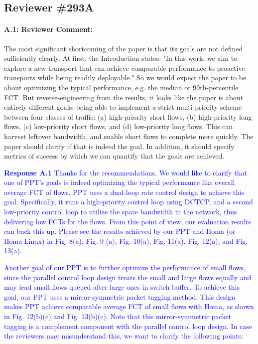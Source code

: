 \documentclass[12pt,one-column]{article}
\begin{document}
\subsection{Reviewer \#293A}
{\it \paragraph{A.1: Reviewer Comment:} The most significant shortcoming of the paper is that its goals are not defined sufficiently clearly. At first, the Introduction states: "In this work, we aim to explore a new transport that can achieve comparable performance to proactive transports while being readily deployable." So we would expect the paper to be about optimizing the typical performance, e.g. the median or 99th-percentile FCT. But reverse-engineering from the results, it looks like the paper is about entirely different goals: being able to implement a strict multi-priority scheme between four classes of traffic: (a) high-priority short flows, (b) high-priority long flows, (c) low-priority short flows, and (d) low-priority long flows. This can harvest leftover bandwidth, and enable short flows to complete more quickly. The paper should clarify if that is indeed the goal. In addition, it should specify metrics of success by which we can quantify that the goals are achieved.}

\noindent\textcolor{blue}{\textbf{Response A.1}
Thanks for the recommendations.
We would like to clarify that one of PPT's goals is indeed optimizing the typical performance like overall average FCT of flows. PPT uses a dual-loop rate control design to achieve this goal. Specifically, it runs a high-priority control loop using DCTCP, and a second low-priority control loop to utilize the spare bandwidth in the network, thus delivering low FCTs for the flows. 
From this point of view, our evaluation results can back this up. Please see the results achieved by our PPT and Homa (or Homa-Linux) in Fig. 8(a), Fig. 9 (a), Fig. 10(a), Fig. 11(a), Fig. 12(a), and Fig. 13(a). 	
}

\textcolor{blue}{Another goal of our PPT is to further optimize the performance of small flows, since the parallel control loop design treats the small and large flows equally and may lead small flows queued after large ones in switch buffer. To achieve this goal, our PPT uses a mirror-symmetric packet tagging method. This design makes PPT achieve comparable average FCT of small flows with Homa, as shown in Fig. 12(b)(c) and Fig. 13(b)(c). Note that this mirror-symmetric packet tagging is a complement component with the parallel control loop design. In case the reviewers may misunderstand this, we want to clarify the following points:}
\end{document}
